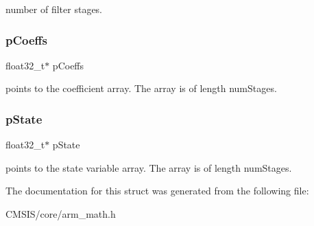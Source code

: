 number of filter stages. \mbox{\label{structarm__fir__lattice__instance__f32_aacbb8dd8eeba4b21fc2bb40076405ee3}} 
\subsubsection{\texorpdfstring{p\+Coeffs}{pCoeffs}}
{\footnotesize\ttfamily float32\+\_\+t$\ast$ p\+Coeffs}

points to the coefficient array. The array is of length num\+Stages. \mbox{\label{structarm__fir__lattice__instance__f32_a335c87e6fdc4b96601d95a5de8b9c463}} 
\subsubsection{\texorpdfstring{p\+State}{pState}}
{\footnotesize\ttfamily float32\+\_\+t$\ast$ p\+State}

points to the state variable array. The array is of length num\+Stages. 

The documentation for this struct was generated from the following file\+:\begin{DoxyCompactItemize}
\item 
C\+M\+S\+I\+S/core/arm\+\_\+math.\+h\end{DoxyCompactItemize}

